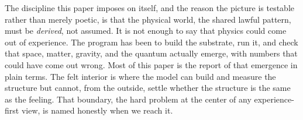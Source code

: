 The discipline this paper imposes on itself, and the reason the picture is testable rather
than merely poetic, is that the physical world, the shared lawful pattern, must be
\emph{derived}, not assumed. It is not enough to say that physics could come out of experience.
The program has been to build the substrate, run it, and check that space, matter, gravity, and
the quantum actually emerge, with numbers that could have come out wrong. Most of this paper is
the report of that emergence in plain terms. The felt interior is where the model can build and
measure the structure but cannot, from the outside, settle whether the structure is the same
as the feeling. That boundary, the hard problem at the center of any experience-first view,
is named honestly when we reach it.
